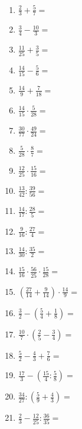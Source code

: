 \begin{Exercise}[title={Berechne die folgenden Ausdrücke und kürze soweit wie möglich}, label=bruecheA1]\\
	\begin{minipage}{\textwidth}
		\begin{minipage}{0.49\textwidth}
			\begin{enumerate}[label=\alph*)]
				\item \(\frac{2}{3}+\frac{5}{7}=\)
				\item \(\frac{3}{4}-\frac{10}{3}=\)
				\item \(\frac{11}{25}+\frac{3}{5}=\)
				\item \(\frac{14}{15}-\frac{5}{6}=\)
				\item \(\frac{14}{9}+\frac{7}{18}=\)
				\item \(\frac{14}{15}\cdot\frac{5}{28}=\)
				\item \(\frac{30}{77}\cdot\frac{49}{24}=\)
				\item \(\frac{5}{28}\cdot\frac{8}{7}=\)
				\item \(\frac{12}{25}\cdot\frac{15}{16}=\)
				\item \(\frac{13}{42}:\frac{39}{56}=\)
				\item \(\frac{14}{17}:\frac{28}{5}=\)
				\item \(\frac{9}{16}:\frac{27}{4}=\)
				\item \(\frac{14}{30}:\frac{35}{2}=\)
			\end{enumerate}
		\end{minipage}
		\begin{minipage}{0.49\textwidth}
			\begin{enumerate}[label=\alph*)]
				\setcounter{enumi}{13}
				\item \(\frac{15}{16}\cdot\frac{56}{25}\cdot\frac{15}{28}=\)
				\item \(\left( \frac{27}{14}+\frac{9}{14}\right) \cdot \frac{14}{9}=\)
				\item \(\frac{3}{2}-\left( \frac{5}{4}+\frac{1}{8}\right) =\)
				\item \(\frac{10}{7}\cdot\left( \frac{2}{5}-\frac{3}{4}\right) =\)
				\item \(\frac{5}{2}-\frac{4}{3}+\frac{7}{6}=\)
				\item \(\frac{17}{3}-\left( \frac{15}{4}:\frac{5}{8}\right) =\)
				\item \(\frac{34}{27}:\left( \frac{5}{9}+\frac{4}{3}\right) =\)
				\item \(\frac{2}{3}-\frac{12}{25}:\frac{36}{35}=\)

\end{enumerate}
\end{minipage}
\end{minipage}
\end{Exercise}
